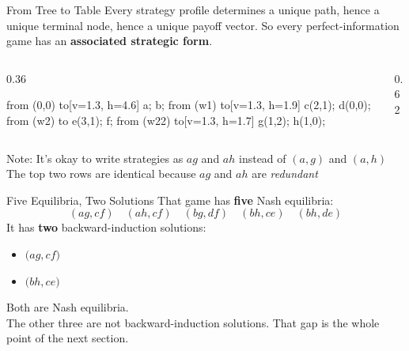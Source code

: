 \begin{frame}{From Tree to Table}
Every strategy profile determines a unique path, hence a unique terminal node,
hence a unique payoff vector.
\bsk
So every perfect-information game has an \textbf{associated strategic form}.
\bsk
\begin{columns}[c]
\begin{column}{0.36\textwidth}
\centering
\begin{gametree}[labels=short, scale=0.62]
  \branch[player=1, root=w, label=90] from (0,0) to[v=1.3, h=4.6] {a; b};
  \branch[player=2, label=135] from (w1) to[v=1.3, h=1.9] {c(2,1); d(0,0)};
  \branch[label=45] from (w2) to {e(3,1); f};
  \branch[player=1, label=45] from (w22) to[v=1.3, h=1.7] {g(1,2); h(1,0)};
\end{gametree}
\end{column}
\begin{column}{0.62\textwidth}
\centering
{}
\end{column}
\end{columns}
\bsk
\raggedright
Note: It's okay to write strategies as $ag$ and $ah$ instead of $(a,g)$ and $(a,h)$
\bsk
The top two rows are identical because $ag$ and $ah$ are \textit{redundant}
\end{frame}

\begin{frame}{Five Equilibria, Two Solutions}
That game has \textbf{five} Nash equilibria:
$$(ag,cf)\quad (ah,cf)\quad (bg,df)\quad (bh,ce)\quad (bh,de)$$
\bsk
It has \textbf{two} backward-induction solutions:
\begin{itemize}
    \item $\big(ag,cf\big)$
    \item $\big(bh,ce\big)$
\end{itemize}
\bsk
Both are Nash equilibria.\\ The other three are not backward-induction solutions.
\vfill
That gap is the whole point of the next section.
\vspace{-0.3in}
\end{frame}

